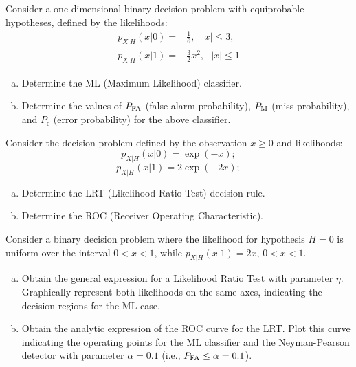 \begin{prob}
\label{ProbDecMLbin}

Consider a one-dimensional binary decision problem with equiprobable hypotheses, defined by the likelihoods:
\begin{align}
p_{X|H}(x|0) = & \frac{1}{6},    \ \ \ |x| \leq 3,  \nonumber \\
p_{X|H}(x|1) = & \frac{3}{2} x^2,\ \ \ |x| \leq 1   \nonumber                         
\end{align}

\begin{enumerate}[a)]
\item Determine the ML (Maximum Likelihood) classifier.
\item Determine the values of $P_{\text{FA}}$ (false alarm probability), $P_{\text{M}}$ (miss probability), and $P_{\text{e}}$ (error probability) for the above classifier.
\end{enumerate}

\end{prob}


\begin{prob}
\label{ROCexp}

Consider the decision problem defined by the observation $x \ge 0$ and likelihoods:
\begin{equation}
p_{X|H}(x|0) = \exp(-x);
\end{equation}
\begin{equation}
p_{X|H}(x|1) = 2 \exp(-2x);
\end{equation}

\begin{enumerate}[a)]
\item Determine the LRT (Likelihood Ratio Test) decision rule.
\item Determine the ROC (Receiver Operating Characteristic).
\end{enumerate}

\end{prob}


\begin{prob}
\label{ProbDecLRTUnifPoison}

Consider a binary decision problem where the likelihood for hypothesis $H = 0$ is uniform over the interval $0 < x < 1$, while $p_{X|H}(x|1) = 2 x$, $0 < x < 1$.

\begin{enumerate}[a)]
\item Obtain the general expression for a Likelihood Ratio Test with parameter $\eta$. Graphically represent both likelihoods on the same axes, indicating the decision regions for the ML case.
\item Obtain the analytic expression of the ROC curve for the LRT. Plot this curve indicating the operating points for the ML classifier and the Neyman-Pearson detector with parameter $\alpha = 0.1$ (i.e., $P_{\text{FA}} \leq \alpha = 0.1$).
\end{enumerate}

\end{prob}



